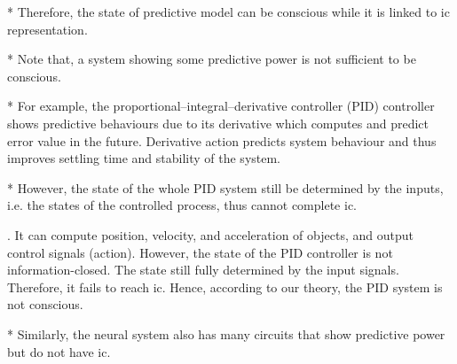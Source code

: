 \documentclass[utf8]{article}
\begin{document}
			* Therefore, the state of predictive model can be conscious while it is linked to \acl{ic} representation. 
			
			* Note that, a system showing some predictive power is not sufficient to be conscious. 
			
			* For example, the proportional–integral–derivative controller (PID) controller shows predictive behaviours due to its derivative which computes and predict error value in the future. Derivative action predicts system behaviour and thus improves settling time and stability of the system. 
			
			* However, the state of the whole PID system still be determined by the inputs, i.e. the states of the controlled process, thus cannot complete \acl{ic}.
			
			. It can compute position, velocity, and acceleration of objects, and output control signals (action). However, the state of the PID controller is not information-closed. The state still fully determined by the input signals. Therefore, it fails to reach \ac{ic}. Hence, according to our theory, the PID system is not conscious. 
			
			* Similarly, the neural system also has many circuits that show predictive power but do not have \ac{ic}.
			
			
\end{document}
